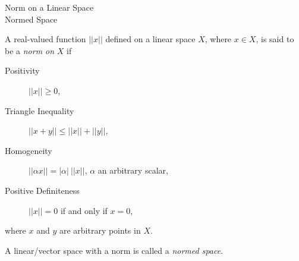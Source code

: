 \documentclass[avery5388,grid,frame]{flashcards}
\begin{document}

\begin{flashcard}[Definition]{Norm on a Linear Space \\ Normed Space}

  A real-valued function $||x||$ defined on a linear space $X$, where
  $x \in X$, is said to be a \emph{norm on} $X$ if

  \smallskip

  \begin{description}
    \item [Positivity]            $||x|| \geq 0$,
    \item [Triangle Inequality]   $||x+y|| \leq ||x|| + ||y||$,
    \item [Homogeneity]           $||\alpha x|| = |\alpha| \:  ||x||$,
                                  $\alpha$ an arbitrary scalar,
    \item [Positive Definiteness] $||x|| = 0$ if and only if $x=0$,
  \end{description}

  \smallskip

  where $x$ and $y$ are arbitrary points in $X$.

  \medskip

  A linear/vector space with a norm is called a \emph{normed space}.
\end{flashcard}
\end{document}
